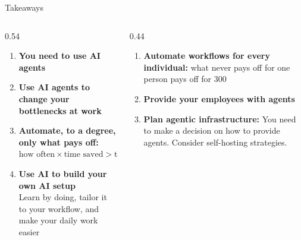 \documentclass[aspectratio=169]{beamer}
\begin{document}
\begin{frame}[shrink=0]{Takeaways}
  \begin{columns}[T]
    \begin{column}{0.54\textwidth}
      \begin{enumerate}
        \setlength{\itemsep}{0.6em}
        \item \textbf{You need to use AI agents}
        \item \textbf{Use AI agents to change your bottlenecks at work}
        \item \textbf{Automate, to a degree, only what pays off:}\\[2pt]
          {\small$\text{how often} \times \text{time saved} > \text{time to build}$}
        \item \textbf{Use AI to build your own AI setup}\\[2pt]
          {\small Learn by doing, tailor it to your workflow, and make your daily work easier}
      \end{enumerate}
    \end{column}
    \begin{column}{0.44\textwidth}
      \begin{enumerate}
        \setlength{\itemsep}{0.6em}
        \item<2-> \textbf{Automate workflows for every individual:} what never pays off for one person pays off for 300
        \item<2-> \textbf{Provide your employees with agents}
        \item<2-> \textbf{Plan agentic infrastructure:}
        You need to make a decision on how to provide agents.
        Consider self-hosting strategies.
      \end{enumerate}
    \end{column}
  \end{columns}
\end{frame}
\end{document}
